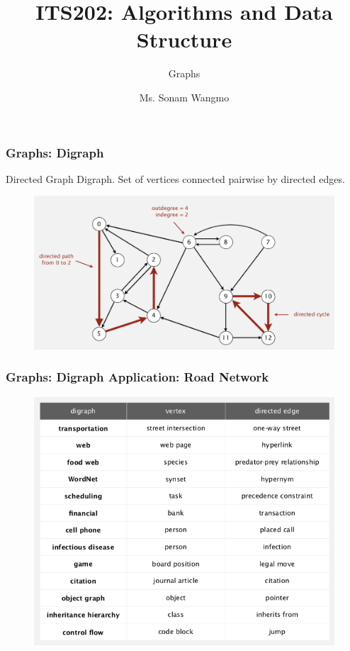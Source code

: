 \documentclass[11pt]{beamer}
\begin{document}
	\author{Ms. Sonam Wangmo}
	\title{ITS202: Algorithms and Data Structure}
	\subtitle{Graphs}
	\institute{
		\textcolor{blue}{Gyalpozhing College of Information Technology \\ Royal University of Bhutan} \\
		\vspace{0.5cm}
	}
	\begin{frame}[plain]
		\maketitle
	\end{frame}

  \begin{frame}
 	\frametitle	{Graphs: Digraph} 
 	\begin{block}{Directed Graph}
 	    Digraph. Set of vertices connected pairwise by directed edges.
 	\end{block} 
    \begin{figure}
    	\centering
    	\includegraphics[width=0.9\linewidth]{"Screenshot 2020-12-03 at 6.31.34 AM"}
    	\label{fig:screenshot-2020-12-03-at-6}
    \end{figure}   
 \end{frame}

  \begin{frame}
	\frametitle	{Graphs: Digraph Application: Road Network} 
    \begin{figure}
    	\centering
    	\includegraphics[width=0.8\linewidth]{"Screenshot 2020-12-03 at 6.34.47 AM"}
    	\label{fig:screenshot-2020-12-03-at-6}
    \end{figure}   
\end{frame}
\end{document}
